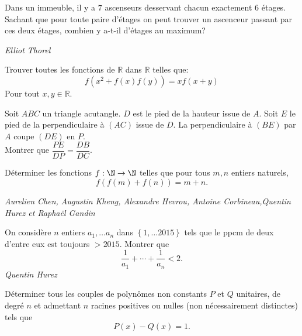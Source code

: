\begin{exo}{}
Dans un immeuble, il y a $7$ ascenseurs desservant chacun exactement $6$ étages. Sachant que pour toute paire d'étages on peut trouver un ascenceur passant par ces deux étages, combien y a-t-il d'étages au maximum?

\medskip
\textit{Elliot Thorel}

\end{exo}



\begin{exo}{}
Trouver toutes les fonctions de $\mathbb{R}$ dans $\mathbb{R}$ telles que:
$$f(x^2+f(x)f(y))=xf(x+y)$$
Pour tout $x,y\in \mathbb{R}$.
\end{exo}



\begin{exo}{}
Soit $ABC$ un triangle acutangle. $D$ est le pied de la hauteur issue de $A$. Soit $E$ le
pied de la perpendiculaire à $(AC)$ issue de $D$. La perpendiculaire à $(BE)$ par $A$ coupe $(DE)$ en $P$. \\
Montrer que $\dfrac{PE}{DP}=\dfrac{DB}{DC}$.
\end{exo}


\begin{exo}{}
Déterminer les fonctions $f : \N \rightarrow \N$ telles que pour tous $m,n$ entiers naturels, $$f(f(m)+f(n))=m+n.$$

\medskip
\textit{Aurelien Chen, Augustin Kheng, Alexandre Hevrou, Antoine Corbineau,Quentin Hurez et Raphaël Gandin}

\end{exo}

\begin{exo}{}
On considère $n$ entiers $a_{1},\ldots a_{n}$
dans $\left\{ 1,\ldots2015\right\} $ tels que le ppcm de deux d'entre
eux est toujours $>2015$. Montrer que
\[
\frac{1}{a_{1}}+\cdots+\frac{1}{a_{n}}<2.
\]
\medskip
\textit{Quentin Hurez}

\end{exo}

\begin{exo}{}Déterminer tous les couples de polynômes non constants $P$ et $Q$ unitaires, de degré $n$ et admettant $n$ racines positives ou nulles (non nécessairement distinctes) tels que
$$P(x) - Q(x) = 1.$$
\end{exo}

